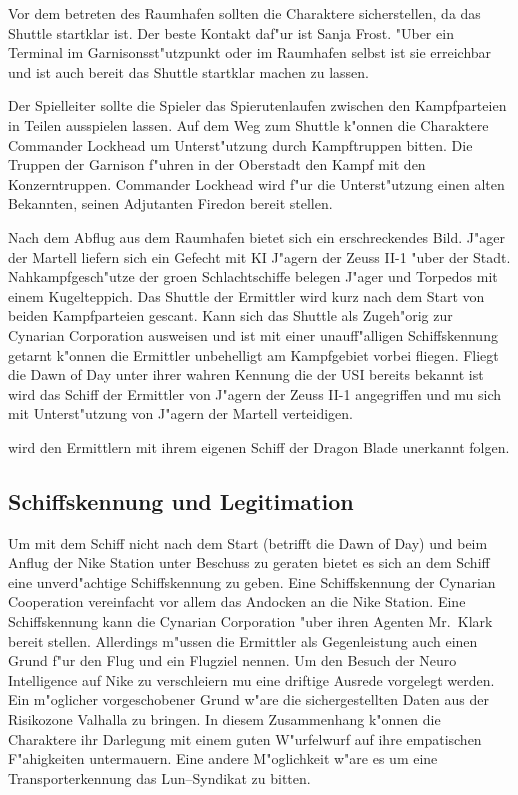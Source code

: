 Vor dem betreten des Raumhafen sollten die Charaktere sicherstellen, da\3 das Shuttle startklar ist. Der beste Kontakt
daf"ur ist Sanja Frost. "Uber ein Terminal im Garnisonsst"utzpunkt oder im Raumhafen selbst ist sie erreichbar und ist
auch bereit das Shuttle startklar machen zu lassen.

Der Spielleiter sollte die Spieler das Spie\3rutenlaufen zwischen den Kampfparteien in Teilen ausspielen lassen. Auf 
dem Weg zum Shuttle k"onnen die Charaktere Commander Lockhead um Unterst"utzung durch Kampftruppen bitten. Die Truppen der Garnison f"uhren in der Oberstadt den Kampf mit den Konzerntruppen. Commander Lockhead wird f"ur die Unterst"utzung einen alten Bekannten, seinen Adjutanten Firedon bereit stellen.

Nach dem Abflug aus dem Raumhafen bietet sich ein erschreckendes Bild. J"ager der Martell liefern sich ein Gefecht mit
KI J"agern der Zeuss II-1 "uber der Stadt. Nahkampfgesch"utze der gro\3en Schlachtschiffe belegen J"ager und Torpedos mit
einem Kugelteppich. Das Shuttle der Ermittler wird kurz nach dem Start von beiden Kampfparteien gescant. Kann sich das 
Shuttle als Zugeh"orig zur Cynarian Corporation ausweisen und ist mit einer unauff"alligen Schiffskennung getarnt k"onnen 
die Ermittler unbehelligt am Kampfgebiet vorbei fliegen. Fliegt die Dawn of Day unter ihrer wahren Kennung die der USI bereits bekannt ist  wird das Schiff der Ermittler von J"agern der Zeuss II-1 angegriffen und mu\3 sich mit Unterst"utzung von J"agern der Martell verteidigen.

\xl{} wird den Ermittlern mit ihrem eigenen Schiff der Dragon Blade unerkannt folgen.

\subsection{Schiffskennung und Legitimation}
Um mit dem Schiff nicht nach dem Start (betrifft die Dawn of Day) und beim Anflug der Nike Station unter Beschuss 
zu geraten bietet es sich an dem Schiff eine unverd"achtige Schiffskennung zu geben. Eine Schiffskennung der Cynarian Cooperation vereinfacht vor allem das Andocken an die Nike Station. Eine Schiffskennung kann die Cynarian Corporation "uber ihren Agenten
Mr.~Klark bereit stellen. Allerdings m"ussen die Ermittler als Gegenleistung auch einen Grund f"ur den Flug und ein Flugziel nennen. Um den Besuch der Neuro Intelligence auf Nike zu verschleiern mu\3 eine driftige Ausrede vorgelegt werden. Ein m"oglicher vorgeschobener Grund w"are die sichergestellten Daten aus der Risikozone Valhalla zu bringen. In diesem Zusammenhang k"onnen die Charaktere ihr Darlegung mit einem guten W"urfelwurf auf ihre empatischen F"ahigkeiten untermauern. Eine andere M"oglichkeit w"are es um eine Transporterkennung das Lun--Syndikat zu bitten.



